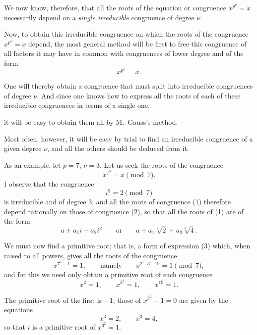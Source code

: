 We now know, therefore, that all the roots of the equation or
congruence $x^{p^\nu}=x$ necessarily depend on a \emph{single
irreducible} congruence of degree $\nu$.

Now, to obtain this irreducible congruence on which the roots of the
congruence $x^{p^\nu}=x$ depend, the most general method will be first
to free this congruence of all factors it may have in common with
congruences of lower degree and of the form
\[
x^{p^\mu}=x.
\]

One will thereby obtain a congruence that must split into irreducible
congruences of degree $\nu$. And since one knows how to express all the
roots of each of these irreducible congruences in terms of a single one,


it will be easy to obtain them all by M.~Gauss's method.

Most often, however, it will be easy by trial to find an irreducible
congruence of a given degree $\nu$, and all the others should be deduced
from it.

As an example, let $p=7$, $\nu=3$. Let us seek the roots of the
congruence
\[
\tag{1}
x^{7^3}=x\pmod 7.
\]
I observe that the congruence
\[
\tag{2}
i^3=2\pmod 7
\]
is irreducible and of degree $3$, and all the roots of congruence (1)
therefore depend rationally on those of congruence (2), so that all the
roots of (1) are of the form
\[
\tag{3}
a+a_1i+a_2i^2\qquad\text{or}\qquad
a+a_1\sqrt[3]{2}+a_2\sqrt[3]{4}.
\]

We must now find a primitive root; that is, a form of expression (3)
which, when raised to all powers, gives all the roots of the congruence
\[
x^{7^3-1}=1,\qquad\text{namely}\qquad
x^{2^1\mathbin{\cdot}3^2\mathbin{\cdot}19}=1\pmod 7,
\]
and for this we need only obtain a primitive root of each congruence
\[
x^2=1,\qquad x^{3^2}=1,\qquad x^{19}=1.
\]

The primitive root of the first is $-1$; those of $x^{3^2}-1=0$ are
given by the equations
\[
x^3=2,\qquad x^3=4,
\]
so that $i$ is a primitive root of $x^{3^2}=1$.

